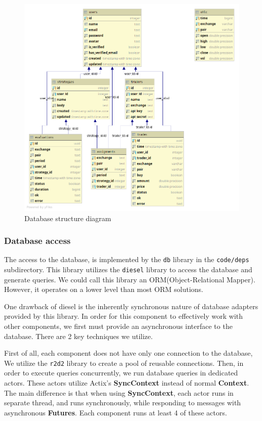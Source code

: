 \begin{figure}[H]
    \includegraphics[width=\textwidth]{obrazky-figures/db.png}
    \caption{Database structure diagram}
    \label{img:arch}
\end{figure}


\subsubsection{Database access}
The access to the database, is implemented by the \verb|db| library in the \verb|code/deps| subdirectory.
This library utilizes the \verb|diesel| library
to access the database and generate queries. We could call this library an ORM(Object-Relational Mapper).
However, it operates on a lower level than most ORM solutions.

One drawback of diesel is the inherently synchronous nature of database adapters provided by this library.
In order for this component to effectively work with other components, we first must provide an asynchronous interface
to the database. There are 2 key techniques we utilize.

First of all, each component does not have only one connection to the database, We utilize the \verb|r2d2| library
to create a pool of reusable connections. Then, in order to execute queries concurrently, we run database queries
in dedicated actors. These actors utilize Actix's \textbf{SyncContext} instead of normal \textbf{Context}. The main difference
is that when using \textbf{SyncContext}, each actor runs in separate thread, and runs synchronously, while responding to
messages with asynchronous \textbf{Futures}. Each component runs at least 4 of these actors.

